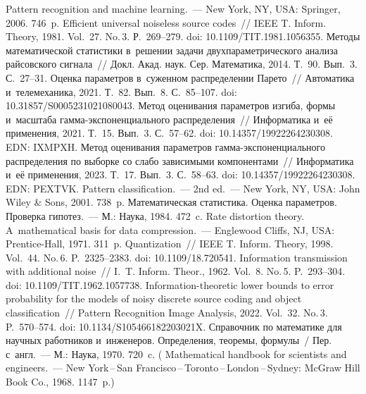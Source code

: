 \begin{multicols}{2}
{\small\frenchspacing
 {\baselineskip=10.6pt
 \begin{thebibliography}{99}
 Pattern recognition and machine learning.~--- New York, NY, USA: Springer, 
2006. 746~p. %
 Efficient universal noiseless 
source codes~// IEEE T. Inform. Theory, 1981. Vol.~27. No.\,3. Р.~269--279. doi: 
10.1109/TIT.1981.1056355.
 Методы математической статистики в~решении задачи 
двухпараметрического анализа райсовского сигнала~// Докл. Акад. наук. Сер. 
Математика, 2014. Т.~90. Вып.~3. С.~27--31.
 Оценка параметров в~суженном распределении Парето~// 
Автоматика и~телемеханика, 2021. Т.~82. Вып.~8. С.~85--107. doi: 10.31857/S0005231021080043.
 Метод оценивания параметров изгиба, 
формы и~масштаба гам\-ма-экс\-по\-нен\-ци\-аль\-но\-го распределения~// Информатика и~её 
применения, 2021. Т.~15. Вып.~3. С.~57--62. doi: 10.14357/19922264230308. EDN: IXMPXH.
 Метод оценивания параметров  
гам\-ма-экс\-по\-нен\-ци\-аль\-но\-го распределения по выборке со слабо зависимыми 
компонентами~// Информатика и~её применения, 2023. Т.~17. Вып.~3. С.~58--63. doi: 
10.14357/19922264230308.  EDN: PEXTVK.
 Pattern classification.~--- 2nd ed.~--- New York, NY, 
USA: John Wiley \& Sons, 2001. 738~p.
 Математическая статистика. Оценка параметров. Проверка гипотез.~--- 
М.: Наука, 1984. 472~c.
 Rate distortion theory. A~mathematical basis for data compression.~--- Englewood Cliffs, 
NJ, USA: Prentice-Hall, 1971. 311~p.
 Quantization~// IEEE T. Inform. Theory, 1998. Vol.~44. No.\,6. 
P.~2325--2383. doi: 10.1109/18.720541.
 Information transmission with additional noise~// I.~T. 
Inform. Theor., 1962. Vol.~8. No.\,5. P.~293--304. doi: 10.1109/TIT.1962.1057738.
 Information-theoretic lower bounds to error probability for the 
models of noisy discrete source coding and object classification~// Pattern Recognition Image Analysis, 2022. 
Vol.~32. No.\,3. P.~570--574. doi: 10.1134/S105466182203021X.
 Справочник по математике для научных работников и~инженеров. 
Определения, теоремы, формулы~/ Пер. с~англ.~--- М.: Наука, 1970. 720~c.
( {Mathematical handbook for scientists and engineers}.~---  
New York\,--\,San Francisco\,--\,Toronto\,--\,London\,--\,Sydney: McGraw Hill Book Co., 1968. 1147~p.)

\end{thebibliography}

 }
 }

\end{multicols}

